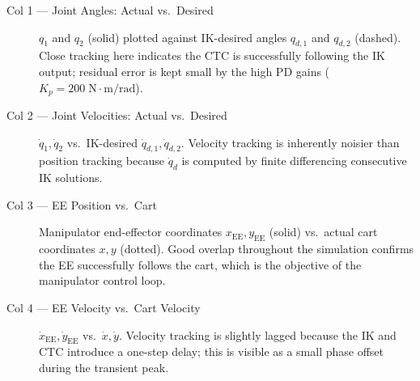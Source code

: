 \documentclass[11pt, a4paper]{article}
\begin{document}
\begin{description}
  \item[Col 1 — Joint Angles: Actual vs.\ Desired]
    $q_1$ and $q_2$ (solid) plotted against IK-desired angles
    $q_{d,1}$ and $q_{d,2}$ (dashed).
    Close tracking here indicates the CTC is successfully following the IK output;
    residual error is kept small by the high PD gains
    ($K_p = 200\;\mathrm{N\cdot m/rad}$).

  \item[Col 2 — Joint Velocities: Actual vs.\ Desired]
    $\dot{q}_1, \dot{q}_2$ vs.\ IK-desired $\dot{q}_{d,1}, \dot{q}_{d,2}$.
    Velocity tracking is inherently noisier than position tracking
    because $\dot{q}_d$ is computed by finite differencing consecutive IK solutions.

  \item[Col 3 — EE Position vs.\ Cart]
    Manipulator end-effector coordinates $x_{\mathrm{EE}}, y_{\mathrm{EE}}$ (solid)
    vs.\ actual cart coordinates $x, y$ (dotted).
    Good overlap throughout the simulation confirms the EE successfully
    follows the cart, which is the objective of the manipulator control loop.

  \item[Col 4 — EE Velocity vs.\ Cart Velocity]
    $\dot{x}_{\mathrm{EE}}, \dot{y}_{\mathrm{EE}}$ vs.\ $\dot{x}, \dot{y}$.
    Velocity tracking is slightly lagged because the IK and CTC introduce
    a one-step delay; this is visible as a small phase offset during the
    transient peak.
\end{description}
\end{document}
